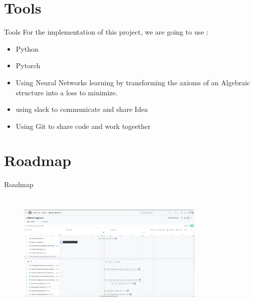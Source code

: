 \documentclass{beamer}
\begin{document}
    \section{Tools}
    \begin{frame}{Tools}
        For the implementation of this project, we are going to use :
        \begin{itemize}
            \item Python
            \item Pytorch
            \item Using Neural Networks learning by transforming the axioms of 
            an Algebraic structure into a loss to minimize.
            \item using slack to communicate and share Idea 
            \item Using Git to share code and work togeether 
        \end{itemize}
    \end{frame}
    \section{Roadmap}
    \begin{frame}{Roadmap}
        \begin{figure}
            \begin{center}
            \includegraphics[width=9cm, height=6cm]{roadmap.png}
            \end{center}
            \end{figure}
        \end{frame}
        


\end{document}
